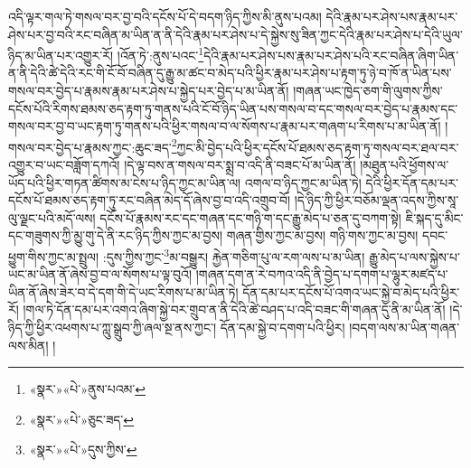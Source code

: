 འདི་ལྟར་གལ་ཏེ་གསལ་བར་བྱ་བའི་དངོས་པོ་དེ་བདག་ཉིད་ཀྱིས་མི་ནུས་པའམ། དེའི་རྣམ་པར་ཤེས་པས་རྣམ་པར་ཤེས་པར་བྱ་བའི་རང་བཞིན་མ་ཡིན་ན་ནི་དེའི་རྣམ་པར་ཤེས་པ་དེ་སྐྱེས་སུ་ཟིན་ཀྱང་དེའི་རྣམ་པར་ཤེས་པ་དེའི་ཡུལ་ཉིད་མ་ཡིན་པར་འགྱུར་རོ། །འོན་ཏེ་:ནུས་པའང་\footnote{«སྣར་»«པེ་»ནུས་པའམ་}དེའི་རྣམ་པར་ཤེས་པས་རྣམ་པར་ཤེས་པའི་རང་བཞིན་ཞིག་ཡིན་ན་ནི་དེའི་ཚེ་དེའི་རང་གི་ངོ་བོ་བཞིན་དུ་རྒྱུ་མ་ཚང་བ་མེད་པའི་ཕྱིར་རྣམ་པར་ཤེས་པ་རྟག་ཏུ་ཉེ་བ་ཁོ་ན་ཡིན་པས་གསལ་བར་བྱེད་པ་རྣམས་རྣམ་པར་ཤེས་པ་སྐྱེད་པར་བྱེད་པ་མ་ཡིན་ནོ། །གཞན་ཡང་ཁྱེད་ཅག་གི་ལུགས་ཀྱིས་དངོས་པོའི་རིགས་ཐམས་ཅད་རྟག་ཏུ་གནས་པའི་ངོ་བོ་ཉིད་ཡིན་པས་གསལ་བ་དང་གསལ་བར་བྱེད་པ་རྣམས་དང་གསལ་བར་བྱ་བ་ཡང་རྟག་ཏུ་གནས་པའི་ཕྱིར་གསལ་བ་ལ་སོགས་པ་རྣམ་པར་གཞག་པ་རིགས་པ་མ་ཡིན་ནོ། །གསལ་བར་བྱེད་པ་རྣམས་ཀྱང་:ཆུང་ཟད་\footnote{«སྣར་»«པེ་»ཅུང་ཟད་}ཀྱང་མི་བྱེད་པའི་ཕྱིར་དངོས་པོ་ཐམས་ཅད་རྟག་ཏུ་གསལ་བར་ཐལ་བར་འགྱུར་བ་ཡང་བཟློག་དཀའོ། །དེ་ལྟ་བས་ན་གསལ་བར་སྨྲ་བ་འདི་ནི་བཟང་པོ་མ་ཡིན་ནོ། །མཐུན་པའི་ཕྱོགས་ལ་ཡོད་པའི་ཕྱིར་གཏན་ཚིགས་མ་ངེས་པ་ཉིད་ཀྱང་མ་ཡིན་ལ། འགལ་བ་ཉིད་ཀྱང་མ་ཡིན་ཏེ། དེའི་ཕྱིར་དོན་དམ་པར་དངོས་པོ་ཐམས་ཅད་རྟག་ཏུ་རང་བཞིན་མེད་དོ་ཞེས་བྱ་བ་འདི་འགྲུབ་བོ། །དེ་ཉིད་ཀྱི་ཕྱིར་བཅོམ་ལྡན་འདས་ཀྱིས་སཱ་ལུ་ལྗང་པའི་མདོ་ལས། དངོས་པོ་རྣམས་རང་དང་གཞན་དང་གཉི་ག་དང་རྒྱུ་མེད་པ་ཅན་དུ་བཀག་སྟེ། ཇི་སྐད་དུ་མིང་དང་གཟུགས་ཀྱི་མྱུ་གུ་དེ་ནི་རང་ཉིད་ཀྱིས་ཀྱང་མ་བྱས། གཞན་གྱིས་ཀྱང་མ་བྱས། གཉི་གས་ཀྱང་མ་བྱས། དབང་ཕྱུག་གིས་ཀྱང་མ་སྤྲུལ། :དུས་ཀྱིས་ཀྱང་\footnote{«སྣར་»«པེ་»དུས་ཀྱིས་}མ་བསྒྱུར། རྐྱེན་གཅིག་པུ་ལ་རག་ལས་པ་མ་ཡིན། རྒྱུ་མེད་པ་ལས་སྐྱེས་པ་ཡང་མ་ཡིན་ནོ་ཞེས་བྱ་བ་ལ་སོགས་པ་ལྟ་བུའོ། །གཞན་དག་ན་རེ་བཀའ་འདི་ནི་བྱེད་པ་དགག་པ་ལྷུར་མཛད་པ་ཡིན་ནོ་ཞེས་ཟེར་བ་དེ་དག་གི་དེ་ཡང་རིགས་པ་མ་ཡིན་ཏེ། དོན་དམ་པར་དངོས་པོ་འགའ་ཡང་སྐྱེ་བ་མེད་པའི་ཕྱིར་རོ། །གལ་ཏེ་དོན་དམ་པར་འགའ་ཞིག་སྐྱེ་བར་གྲུབ་ན་ནི་དེའི་ཚེ་བཤད་པ་འདི་བཟང་གི་གཞན་དུ་ནི་མ་ཡིན་ནོ། །དེ་ཉིད་ཀྱི་ཕྱིར་འཕགས་པ་ཀླུ་སྒྲུབ་ཀྱི་ཞལ་སྔ་ནས་ཀྱང་། དོན་དམ་སྐྱེ་བ་དགག་པའི་ཕྱིར། །བདག་ལས་མ་ཡིན་གཞན་ལས་མིན། །
